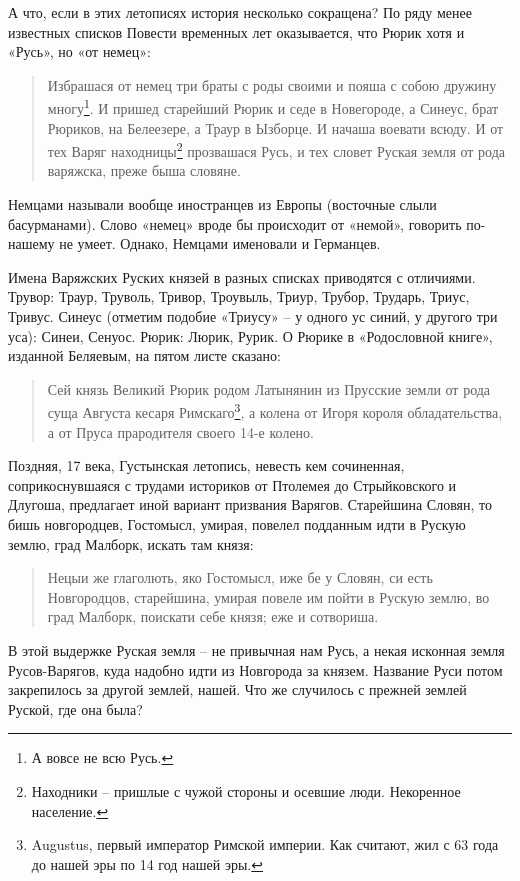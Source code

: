 А что, если в этих летописях история несколько сокращена? По ряду менее известных списков Повести временных лет оказывается, что Рюрик хотя и «Русь», но «от немец»:

\begin{quotation}
Избрашася от немец три браты с роды своими и пояша с собою дружину многу\footnote{А вовсе не всю Русь.}. И пришед старейший Рюрик и седе в Новегороде, а Синеус, брат Рюриков, на Белеезере, а Траур в Ызборце. И начаша воевати всюду. И от тех Варяг находницы\footnote{Находники – пришлые с чужой стороны и осевшие люди. Некоренное население.} прозвашася Русь, и тех словет Руская земля от рода варяжска, преже быша словяне. 
\end{quotation}

Немцами называли вообще иностранцев из Европы (восточные слыли басурманами). Слово «немец» вроде бы происходит от «немой», говорить по-нашему не умеет. Однако, Немцами именовали и Германцев.

Имена Варяжских Руских князей в разных списках приводятся с отличиями. Трувор: Траур, Труволь, Тривор, Троувыль, Триур, Трубор, Трударь, Триус, Тривус. Синеус (отметим подобие «Триусу» – у одного ус синий, у другого три уса): Синеи, Сенуос. Рюрик: Люрик, Рурик. О Рюрике в «Родословной книге», изданной Беляевым, на пятом листе сказано:

\begin{quotation}
Сей князь Великий Рюрик родом Латынянин из Прусские земли от рода суща Августа кесаря Римскаго\footnote{Augustus, первый император Римской империи. Как считают, жил с 63 года до нашей эры по 14 год нашей эры.}, а колена от Игоря короля обладательства, а от Пруса прародителя своего 14-е колено.
\end{quotation}

Поздняя, 17 века, Густынская летопись, невесть кем сочиненная, соприкоснувшаяся с трудами историков от Птолемея до Стрыйковского и Длугоша, предлагает иной вариант призвания Варягов. Старейшина Словян, то бишь новгородцев, Гостомысл, умирая, повелел подданным идти в Рускую землю, град Малборк, искать там князя:

\begin{quotation}
Нецыи же глаголють, яко Гостомысл, иже бе у Словян, си есть Новгородцов, старейшина, умирая повеле им пойти в Рускую землю, во град Малборк, поискати себе князя; еже и сотвориша.
\end{quotation}

В этой выдержке Руская земля – не привычная нам Русь, а некая исконная земля Русов-Варягов, куда надобно идти из Новгорода за князем. Название Руси потом закрепилось за другой землей, нашей. Что же случилось с прежней землей Руской, где она была?


